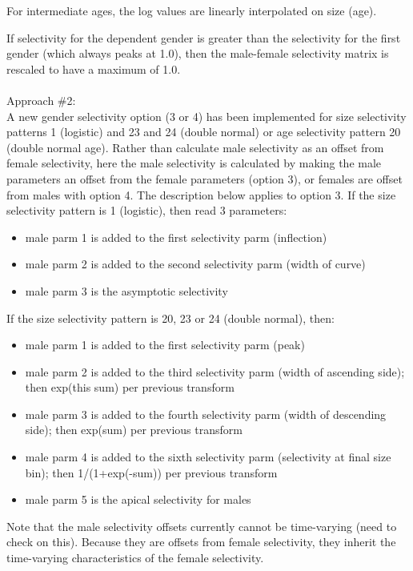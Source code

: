 For intermediate ages, the log values are linearly interpolated on size (age).

If selectivity for the dependent gender is greater than the selectivity for the first gender (which always peaks at 1.0), then the male-female selectivity matrix is rescaled to have a maximum of 1.0.\\
\\
Approach \#2:\\
A new gender selectivity option (3 or 4) has been implemented for size selectivity patterns 1 (logistic) and 23 and 24 (double normal) or age selectivity pattern 20 (double normal age).  Rather than calculate male selectivity as an offset from female selectivity, here the male selectivity is calculated by making the male parameters an offset from the female parameters (option 3), or females are offset from males with option 4.  The description below applies to option 3. If the size selectivity pattern is 1 (logistic), then read 3 parameters:
\begin{itemize}
	\item male parm 1 is added to the first selectivity parm (inflection)
	\item male parm 2 is added to the second selectivity parm (width of curve)
	\item male parm 3 is the asymptotic selectivity
\end{itemize}

If the size selectivity pattern is 20, 23 or 24 (double normal), then:
\begin{itemize}
	\item male parm 1 is added to the first selectivity parm (peak)
	\item male parm 2 is added to the third selectivity parm (width of ascending side); then exp(this sum) per previous transform
	\item male parm 3 is added to the fourth selectivity parm (width of descending side); then exp(sum) per previous transform
	\item male parm 4 is added to the sixth selectivity parm (selectivity at final size bin); then 1/(1+exp(-sum)) per previous transform
	\item male parm 5 is the apical selectivity for males
\end{itemize}

Note that the male selectivity offsets currently cannot be time-varying (need to check on this).  Because they are offsets from female selectivity, they inherit the time-varying characteristics of the female selectivity.

